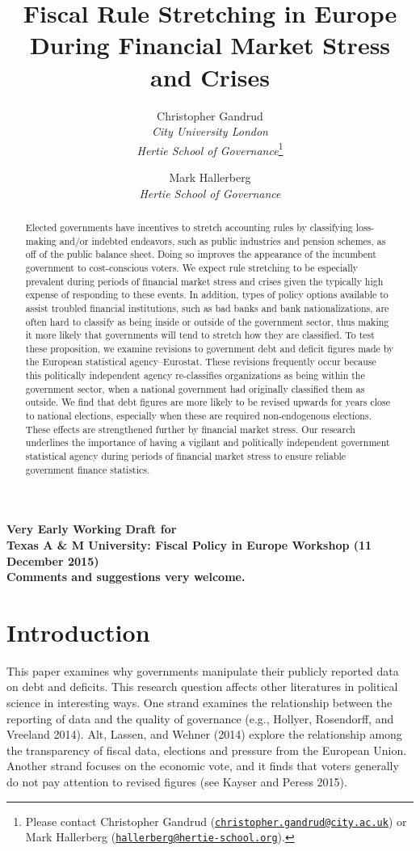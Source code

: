 \documentclass[]{article}
\title{Fiscal Rule Stretching in Europe During Financial Market Stress and Crises}
\author{Christopher Gandrud \\ \emph{City University London} \\ \emph{Hertie School of Governance}\footnote{Please contact Christopher Gandrud
(\href{mailto:christopher.gandrud@city.ac.uk}{\nolinkurl{christopher.gandrud@city.ac.uk}}) or Mark Hallerberg (\href{mailto:hallerberg@hertie-school.org}{\nolinkurl{hallerberg@hertie-school.org}}).}
\and
Mark Hallerberg \\ \emph{Hertie School of Governance}}
\begin{document}
\maketitle

\begin{center}
    \textbf{Very Early Working Draft for\\ Texas A \& M University: Fiscal Policy in Europe Workshop (11 December 2015) \\
    Comments and suggestions very welcome.}
\end{center}

\begin{abstract}
    Elected governments have incentives to stretch accounting rules by classifying loss-making and/or indebted endeavors, such as public industries and pension schemes, as off of the public balance sheet. Doing so improves the appearance of the incumbent government to cost-conscious voters. We expect rule stretching to be especially prevalent during periods of financial market stress and crises given the typically high expense of responding to these events. In addition, types of policy options available to assist troubled financial institutions, such as bad banks and bank nationalizations, are often hard to classify as being inside or outside of the government sector, thus making it more likely that governments will tend to stretch how they are classified. To test these proposition, we examine revisions to government debt and deficit figures made by the European statistical agency--Eurostat. These revisions frequently occur because this politically independent agency re-classifies organizations as being within the government sector, when a national government had originally classified them as outside. We find that debt figures are more likely to be revised upwards for years close to national elections, especially when these are required non-endogenous elections. These effects are strengthened further by financial market stress. Our research underlines the importance of having a vigilant and politically independent government statistical agency during periods of financial market stress to ensure reliable government finance statistics.
\end{abstract}

\section{Introduction}

This paper examines why governments manipulate their publicly reported data on debt and deficits. This research question affects other literatures in political science in interesting ways. One strand examines the relationship between the reporting of data and the quality of governance (e.g., Hollyer, Rosendorff, and Vreeland 2014).  Alt, Lassen, and Wehner (2014) explore the relationship among the transparency of fiscal data, elections and pressure from the European Union. Another strand focuses on the economic vote, and it finds that voters generally do not pay attention to revised figures (see Kayser and Peress 2015). 
\end{document}
